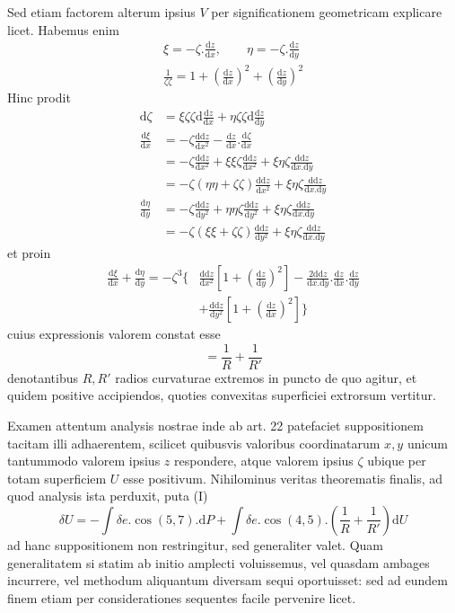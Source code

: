 Sed etiam factorem alterum ipsius $V$ per significationem geometricam explicare licet. Habemus enim
\[
\begin{gathered}
\xi=-\zeta.\frac{\mathrm{d}z}{\mathrm{d}x},\qquad \eta=-\zeta.\frac{\mathrm{d}z}{\mathrm{d}y}\\
\frac{1}{\zeta\zeta}=1+(\frac{\mathrm{d}z}{\mathrm{d}x})^2+(\frac{\mathrm{d}z}{\mathrm{d}y})^2
\end{gathered}
\]
Hinc prodit
\[
\begin{aligned}
\mathrm{d}\zeta&=\xi\zeta\zeta\mathrm{d}\frac{\mathrm{d}z}{\mathrm{d}x}+\eta\zeta\zeta\mathrm{d}\frac{\mathrm{d}z}{\mathrm{d}y}\\
\frac{\mathrm{d}\xi}{\mathrm{d}x}&=-\zeta\frac{\mathrm{dd}z}{\mathrm{d}x^2}-\frac{\mathrm{d}z}{\mathrm{d}x}.\frac{\mathrm{d}\zeta}{\mathrm{d}x}\\
&=-\zeta\frac{\mathrm{dd}z}{\mathrm{d}x^2}+\xi\xi\zeta\frac{\mathrm{dd}z}{\mathrm{d}x^2}+\xi\eta\zeta\frac{\mathrm{dd}z}{\mathrm{d}x.\mathrm{d}y}\\
&=-\zeta(\eta\eta+\zeta\zeta)\frac{\mathrm{dd}z}{\mathrm{d}x^2}+\xi\eta\zeta\frac{\mathrm{dd}z}{\mathrm{d}x.\mathrm{d}y}\\
\frac{\mathrm{d}\eta}{\mathrm{d}y}&=-\zeta\frac{\mathrm{dd}z}{\mathrm{d}y^2}+\eta\eta\zeta\frac{\mathrm{dd}z}{\mathrm{d}y^2}+\xi\eta\zeta\frac{\mathrm{dd}z}{\mathrm{d}x.\mathrm{d}y}\\
&=-\zeta(\xi\xi+\zeta\zeta)\frac{\mathrm{dd}z}{\mathrm{d}y^2}+\xi\eta\zeta\frac{\mathrm{dd}z}{\mathrm{d}x.\mathrm{d}y}
\end{aligned}
\]
et proin
\[
\begin{aligned}
\frac{\mathrm{d}\xi}{\mathrm{d}x}+\frac{\mathrm{d}\eta}{\mathrm{d}y}=-\zeta^3\big\{&\frac{\mathrm{dd}z}{\mathrm{d}x^2}[1+(\frac{\mathrm{d}z}{\mathrm{d}y})^2]-\frac{2\mathrm{dd}z}{\mathrm{d}x.\mathrm{d}y}.\frac{\mathrm{d}z}{\mathrm{d}x}.\frac{\mathrm{d}z}{\mathrm{d}y}\\
&+\frac{\mathrm{dd}z}{\mathrm{d}y^2}[1+(\frac{\mathrm{d}z}{\mathrm{d}x})^2]\big\}
\end{aligned}
\]
cuius expressionis valorem constat esse
\[
=\frac{1}{R}+\frac{1}{R'}
\]
denotantibus $R,R'$ radios curvaturae extremos in puncto de quo agitur, et quidem positive accipiendos, quoties convexitas superficiei extrorsum vertitur.

Examen attentum analysis nostrae inde ab art. 22 patefaciet suppositionem tacitam illi adhaerentem, scilicet quibusvis valoribus coordinatarum $x,y$ unicum tantummodo valorem ipsius $z$ respondere, atque valorem ipsius $\zeta$ ubique per totam superficiem $U$ esse positivum. Nihilominus veritas theorematis finalis, ad quod analysis ista perduxit, puta (I)
\[
\delta U=-\int\delta e.\cos(5,7).\mathrm{d}P+\int\delta e.\cos(4,5).(\frac{1}{R}+\frac{1}{R'})\mathrm{d}U
\]
ad hanc suppositionem non restringitur, sed generaliter valet. Quam generalitatem si statim ab initio amplecti voluissemus, vel quasdam ambages incurrere, vel methodum aliquantum diversam sequi oportuisset: sed ad eundem finem etiam per considerationes sequentes facile pervenire licet.


